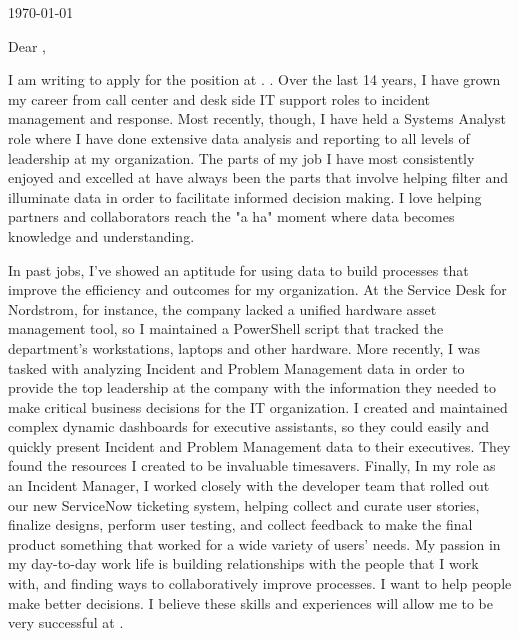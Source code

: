 \documentclass[10pt,oneside]{article}
\begin{document}
\hfill\dte\today
\heading
\vspace{\baselineskip}
\vspace{\baselineskip}

Dear ,

\vspace{\baselineskip}

I am writing to apply for the  position at . . Over the last 14 years, I have grown my career from call center and desk side IT support roles to incident management and response. Most recently, though, I have held a Systems Analyst role where I have done extensive data analysis and reporting to all levels of leadership at my organization. The parts of my job I have most consistently enjoyed and excelled at have always been the parts that involve helping filter and illuminate data in order to facilitate informed decision making. I love helping partners and collaborators reach the "a ha" moment where data becomes knowledge and understanding.

\vspace{\baselineskip}

In past jobs, I’ve showed an aptitude for using data to build processes that improve the efficiency and outcomes for my organization. At the Service Desk for Nordstrom, for instance, the company lacked a unified hardware asset management tool, so I maintained a PowerShell script that tracked the department’s workstations, laptops and other hardware. More recently, I was tasked with analyzing Incident and Problem Management data in order to provide the top leadership at the company with the information they needed to make critical business decisions for the IT organization. I created and maintained complex dynamic dashboards for executive assistants, so they could easily and quickly present Incident and Problem Management data to their executives. They found the resources I created to be invaluable timesavers. Finally, In my role as an Incident Manager, I worked closely with the developer team that rolled out our new ServiceNow ticketing system, helping collect and curate user stories, finalize designs, perform user testing, and collect feedback to make the final product something that worked for a wide variety of users' needs.  My passion in my day-to-day work life is building relationships with the people that I work with, and finding ways to collaboratively improve processes. I want to help people make better decisions. I believe these skills and experiences will allow me to be very successful at .
\end{document}
